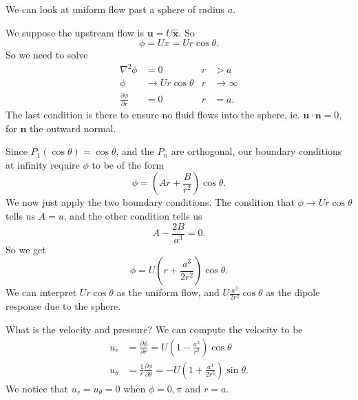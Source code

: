 \documentclass[a4paper]{article}
\begin{document}
\begin{eg}
  We can look at uniform flow past a sphere of radius $a$.
  \begin{center}
  \end{center}
  We suppose the upstream flow is $\mathbf{u} = U \hat{\mathbf{x}}$. So
  \[
    \phi = Ux = Ur\cos \theta.
  \]
  So we need to solve
  \begin{align*}
    \nabla^2 \phi &= 0 & r &>a\\
    \phi&\to Ur \cos \theta & r &\to \infty\\
    \frac{\partial \phi}{\partial r}&= 0 & r&=a.
  \end{align*}
  The last condition is there to ensure no fluid flows into the sphere, ie. $\mathbf{u}\cdot \mathbf{n} = 0$, for $\mathbf{n}$ the outward normal.

  Since $P_1(\cos \theta) = \cos \theta$, and the $P_n$ are orthogonal, our boundary conditions at infinity require $\phi$ to be of the form
  \[
    \phi = \left(Ar + \frac{B}{r^2}\right) \cos \theta.
  \]
  We now just apply the two boundary conditions. The condition that $\phi \to Ur \cos \theta$ tells us $A = u$, and the other condition tells us
  \[
    A - \frac{2B}{a^3} = 0.
  \]
  So we get
  \[
    \phi = U\left(r + \frac{a^3}{2r^2}\right) \cos \theta.
  \]
  We can interpret $Ur \cos \theta$ as the uniform flow, and $U \frac{a^3}{2r^2} \cos \theta$ as the dipole response due to the sphere.

  What is the velocity and pressure? We can compute the velocity to be
  \begin{align*}
    u_r &= \frac{\partial \phi}{\partial r} = U\left(1 - \frac{a^3}{r^3}\right) \cos \theta\\
    u_\theta &= \frac{1}{r} \frac{\partial \phi}{\partial \theta} = -U\left(1 + \frac{a^3}{2r^3}\right)\sin \theta.
  \end{align*}
  We notice that $u_r = u_\theta = 0$ when $\phi = 0, \pi$ and $r = a$.


\end{eg}
\end{document}
